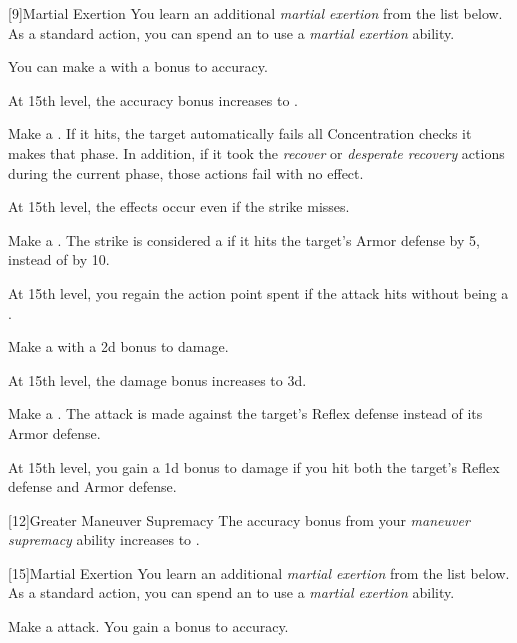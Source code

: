             [9]{Martial Exertion}
            You learn an additional \textit{martial exertion} from the list below.
            As a standard action, you can spend an  to use a \textit{martial exertion} ability.
            {
                 You can make a  with a  bonus to accuracy.

                At 15th level, the accuracy bonus increases to .

                 Make a .
                If it hits, the target automatically fails all Concentration checks it makes that phase.
                In addition, if it took the \textit{recover} or \textit{desperate recovery} actions during the current phase, those actions fail with no effect.

                At 15th level, the effects occur even if the strike misses.

                 Make a .
                The strike is considered a  if it hits the target's Armor defense by 5, instead of by 10.

                At 15th level, you regain the action point spent if the attack hits without being a .

                 Make a  with a \plus2d bonus to damage.

                At 15th level, the damage bonus increases to \plus3d.

                 Make a .
                The attack is made against the target's Reflex defense instead of its Armor defense.

                At 15th level, you gain a \plus1d bonus to damage if you hit both the target's Reflex defense and Armor defense.
            }

            [12]{Greater Maneuver Supremacy} The accuracy bonus from your \textit{maneuver supremacy} ability increases to .

            [15]{Martial Exertion} 
            You learn an additional \textit{martial exertion} from the list below.
            As a standard action, you can spend an  to use a \textit{martial exertion} ability.
            {

                 Make a  attack.
                You gain a  bonus to accuracy.
            }

